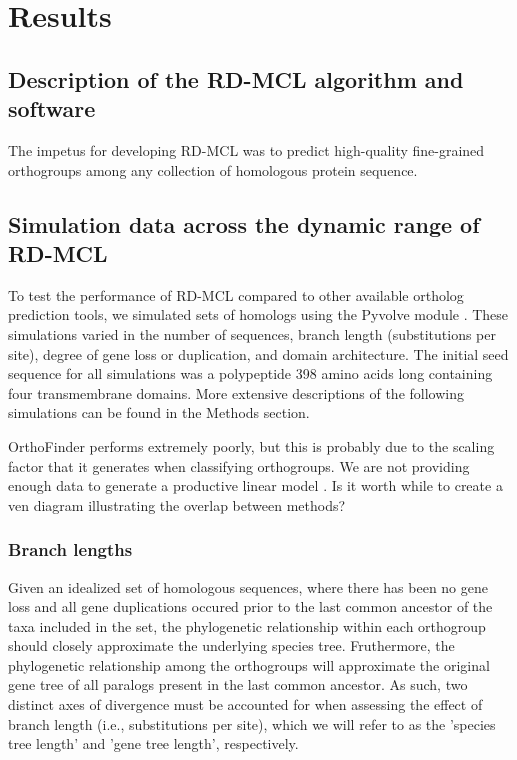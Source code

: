 \documentclass[twocolumn]{bmcart}%
\begin{document}
\section{Results}
\subsection{Description of the RD-MCL algorithm and software}
The impetus for developing RD-MCL was to predict high-quality fine-grained orthogroups among any collection of homologous protein sequence.

\lipsum[3]

\subsection{Simulation data across the dynamic range of RD-MCL}
To test the performance of RD-MCL compared to other available ortholog prediction tools, we simulated sets of homologs using the Pyvolve module \cite{Spielman:2015kv}. These simulations varied in the number of sequences, branch length (substitutions per site), degree of gene loss or duplication, and domain architecture. The initial seed sequence for all simulations was a polypeptide 398 amino acids long containing four transmembrane domains. More extensive descriptions of the following simulations can be found in the Methods section.

OrthoFinder performs extremely poorly, but this is probably due to the scaling factor that it generates when classifying orthogroups. We are not providing enough data to generate a productive linear model \cite{Emms:2015ig}.
Is it worth while to create a ven diagram illustrating the overlap between methods?

\subsubsection{Branch lengths}
Given an idealized set of homologous sequences, where there has been no gene loss and all gene duplications occured prior to the last common ancestor of the taxa included in the set, the phylogenetic relationship within each orthogroup should closely approximate the underlying species tree. Fruthermore, the phylogenetic relationship among the orthogroups will approximate the original gene tree of all paralogs present in the last common ancestor. As such, two distinct axes of divergence must be accounted for when assessing the effect of branch length (i.e., substitutions per site), which we will refer to as the 'species tree length' and 'gene tree length', respectively.
\end{document}
